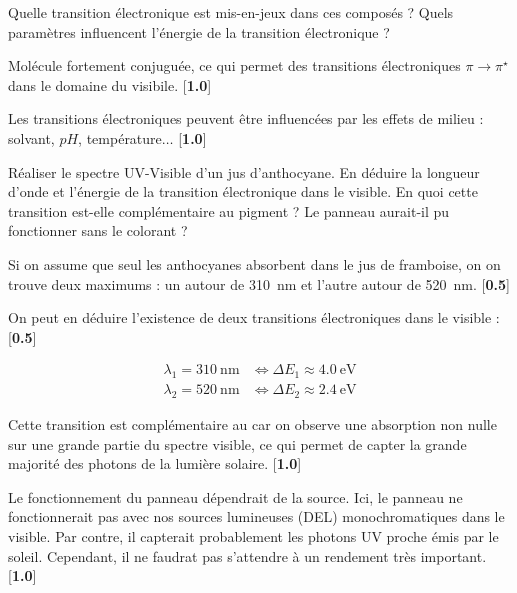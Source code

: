 \documentclass[twoside,a4paper,11pt,addpoints,answers]{exam}%
\newcounter{foo} %
\begin{document}
\begin{questions}
\setcounter{question}{\thefoo}

\question[2] Quelle transition électronique est mis-en-jeux dans ces composés ? Quels paramètres influencent l'énergie de la transition électronique ?%

\begin{mybox}
\begin{solution}[5cm]

Molécule fortement conjuguée, ce qui permet des transitions électroniques $\pi \to \pi^\star$ dans le domaine du visibile. [\textbf{1.0}]

Les transitions électroniques peuvent être influencées par les effets de milieu : solvant, $pH$, température$\ldots$  [\textbf{1.0}]


\end{solution}
\end{mybox}

\question[3] Réaliser le spectre UV-Visible d'un jus d'anthocyane. En déduire la longueur d'onde et l'énergie de la transition électronique dans le visible. En quoi cette transition est-elle complémentaire au pigment  ? Le panneau aurait-il pu fonctionner sans le colorant ?

\begin{mybox}
\begin{solution}[5cm]

Si on assume que seul les anthocyanes absorbent dans le jus de framboise, on on trouve deux maximums : un autour de \SI{310}{\nano\meter} et l'autre autour de \SI{520}{\nano\meter}. [\textbf{0.5}]

On peut en déduire l'existence de deux transitions électroniques dans le visible : [\textbf{0.5}]

\begin{align*}
\lambda_1 = 310 ~ \si{\nano\meter} &\iff \Delta E_1 \approx \SI{4.0}{\electronvolt} \\
\lambda_2 = 520 ~ \si{\nano\meter} &\iff \Delta E_2 \approx \SI{2.4}{\electronvolt}
\end{align*}

Cette transition est complémentaire au  car on observe une absorption non nulle sur une grande partie du spectre visible, ce qui permet de capter la grande majorité des photons de la lumière solaire. [\textbf{1.0}]

Le fonctionnement du panneau dépendrait de la source. Ici, le panneau ne fonctionnerait pas avec nos sources lumineuses (DEL) monochromatiques dans le visible. Par contre, il capterait probablement les photons UV proche émis par le soleil. Cependant, il ne faudrat pas s'attendre à un rendement très important. [\textbf{1.0}]




\end{solution}
\end{mybox}
\end{questions}
\end{document}
